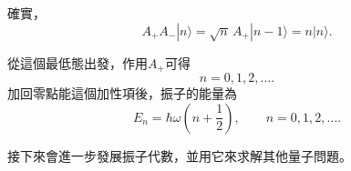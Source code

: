確實，
\begin{equation}
A_+A_-|n\rangle
=\sqrt n\,A_+|n-1\rangle
=n|n\rangle.
\end{equation}

\begin{classroomqa}
\end{classroomqa}


從這個最低態出發，作用\(A_+\)可得
\begin{equation}
n=0,1,2,\ldots.
\end{equation}
加回零點能這個加性項後，振子的能量為
\begin{equation}
E_n=\hbar\omega\left(n+\frac{1}{2}\right),
\qquad n=0,1,2,\ldots.
\end{equation}

接下來會進一步發展振子代數，並用它來求解其他量子問題。